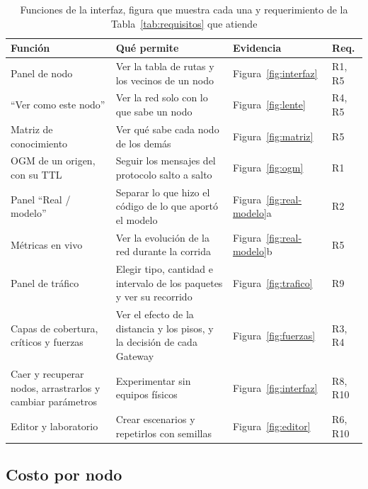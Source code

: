 \begin{table}[htbp!]
    \centering
    \caption{Funciones de la interfaz, figura que muestra cada una y requerimiento de la Tabla~\ref{tab:requisitos} que atiende}
    \label{tab:interfaz}
    \footnotesize
    \begin{tabular}{|p{4.3cm}|p{5.9cm}|p{1.7cm}|p{1.5cm}|}
        \hline
        \textbf{Función} & \textbf{Qué permite} & \textbf{Evidencia} & \textbf{Req.} \\
        \hline
        Panel de nodo & Ver la tabla de rutas y los vecinos de un nodo & Figura~\ref{fig:interfaz} & R1, R5 \\
        \hline
        ``Ver como este nodo'' & Ver la red solo con lo que sabe un nodo & Figura~\ref{fig:lente} & R4, R5 \\
        \hline
        Matriz de conocimiento & Ver qué sabe cada nodo de los demás & Figura~\ref{fig:matriz} & R5 \\
        \hline
        OGM de un origen, con su TTL & Seguir los mensajes del protocolo salto a salto & Figura~\ref{fig:ogm} & R1 \\
        \hline
        Panel ``Real / modelo'' & Separar lo que hizo el código de lo que aportó el modelo & Figura~\ref{fig:real-modelo}a & R2 \\
        \hline
        Métricas en vivo & Ver la evolución de la red durante la corrida & Figura~\ref{fig:real-modelo}b & R5 \\
        \hline
        Panel de tráfico & Elegir tipo, cantidad e intervalo de los paquetes y ver su recorrido & Figura~\ref{fig:trafico} & R9 \\
        \hline
        Capas de cobertura, críticos y fuerzas & Ver el efecto de la distancia y los pisos, y la decisión de cada Gateway & Figura~\ref{fig:fuerzas} & R3, R4 \\
        \hline
        Caer y recuperar nodos, arrastrarlos y cambiar parámetros & Experimentar sin equipos físicos & Figura~\ref{fig:interfaz} & R8, R10 \\
        \hline
        Editor y laboratorio & Crear escenarios y repetirlos con semillas & Figura~\ref{fig:editor} & R6, R10 \\
        \hline
    \end{tabular}
\end{table}

\subsection{Costo por nodo}
\label{subsec:costo}

